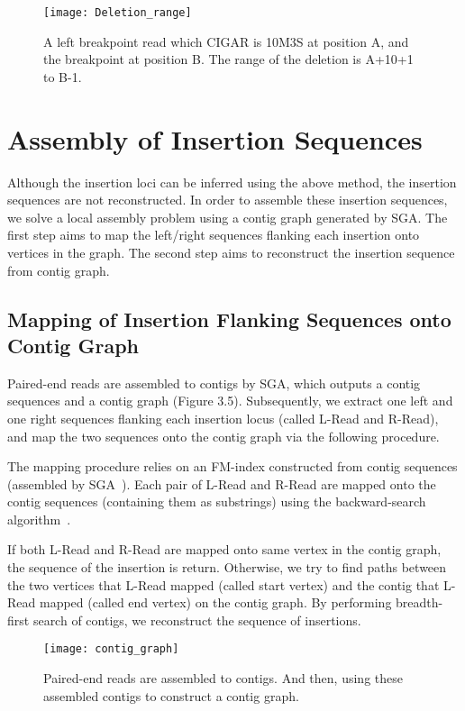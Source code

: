 \begin{figure}[ht]
\begin{center}
\texttt{[image: Deletion\_range]}
\caption{ A left breakpoint read which CIGAR is 10M3S at position A, and the breakpoint at position B. The range of the deletion is A+10+1 to B-1. }
\label{}
\end{center}
\end{figure}

\newpage
\section{Assembly of Insertion Sequences}

Although the insertion loci can be inferred using the above method, the insertion sequences are not reconstructed. In order to assemble these insertion sequences, we solve a local assembly problem using a contig graph generated by SGA. The first step aims to map the left/right sequences flanking each insertion onto vertices in the graph. The second step aims to reconstruct the insertion sequence from contig graph.

\subsection{Mapping of Insertion Flanking Sequences onto Contig Graph}

Paired-end reads are assembled to contigs by SGA, which outputs a contig sequences and a contig graph (Figure 3.5). Subsequently, we extract one left and one right sequences flanking each insertion locus (called L-Read and R-Read), and map the two sequences onto the contig graph via the following procedure. 

The mapping procedure relies on an FM-index constructed from contig sequences (assembled by SGA~\cite{Simpson2012a}). Each pair of L-Read and R-Read are mapped onto the contig sequences (containing them as substrings) using the backward-search algorithm~\cite{Ferragina2000}. 

If both L-Read and R-Read are mapped onto same vertex in the contig graph, the sequence of the insertion is return. Otherwise, we try to find paths between the two vertices that L-Read mapped (called start vertex) and the contig that L-Read mapped (called end vertex) on the contig graph. By performing breadth-first search of contigs, we reconstruct the sequence of insertions.



\begin{figure}[ht]
\begin{center}
\texttt{[image: contig\_graph]}
\caption{Paired-end reads are assembled to contigs. And then, using these assembled contigs to construct a contig graph.}
\label{}
\end{center}
\end{figure}

